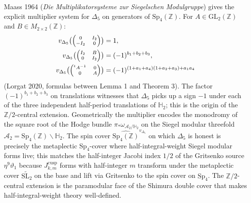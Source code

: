 \begin{remark}
\label{rem:k3e-maass-multiplier-explicit}
Maass 1964 (\emph{Die Multiplikatorsysteme zur Siegelschen Modulgruppe}) gives the
explicit multiplier system for $\Delta_5$ on generators of $\mathrm{Sp}_4(\mathbb{Z})$.
For $A\in\mathrm{GL}_2(\mathbb{Z})$ and $B\in M_{2\times 2}(\mathbb{Z})$:
\begin{align*}
 v_{\Delta_5}\bigl({\scriptsize\begin{pmatrix} 0 & I_2 \\ -I_2 & 0\end{pmatrix}}\bigr)
 &= 1, \\
 v_{\Delta_5}\bigl({\scriptsize\begin{pmatrix} I_2 & B \\ 0 & I_2\end{pmatrix}}\bigr)
 &= (-1)^{b_1+b_2+b_3}, \\
 v_{\Delta_5}\bigl({\scriptsize\begin{pmatrix} {}^tA^{-1} & 0 \\ 0 & A\end{pmatrix}}\bigr)
 &= (-1)^{(1+a_1+a_4)(1+a_2+a_3)+a_1 a_4}
\end{align*}
(Lorgat 2020, formulas between Lemma 1 and Theorem 3). The factor $(-1)^{b_1+b_2+b_3}$
on translations witnesses that $\Delta_5$ picks up a sign $-1$ under each of the three
independent half-period translations of $\mathbb{H}_2$; this is the origin of the
$\mathbb{Z}/2$-central extension. Geometrically the multiplier encodes the monodromy
of the square root of the Hodge bundle $\pi_*\omega_{\mathcal{A}_2/\mathbb{H}_2}$ on
the Siegel modular threefold $\mathcal{A}_2 = \mathrm{Sp}_4(\mathbb{Z})\backslash\mathbb{H}_2$.
The spin cover $\widehat{\mathrm{Sp}_4(\mathbb{Z})}^{v_{\Delta_5}}$ on which
$\Delta_5$ is honest is precisely the metaplectic $\mathrm{Sp}_4$-cover where
half-integral-weight Siegel modular forms live; this matches the half-integer Jacobi
index $1/2$ of the Gritsenko source $\eta^9\vartheta_1$ because
$J^{\mathrm{cusp}}_{k,m}$ forms with half-integer $m$ transform under the metaplectic
cover $\widetilde{\mathrm{SL}_2}$ on the base and lift via Gritsenko to the spin cover
on $\mathrm{Sp}_4$. The $\mathbb{Z}/2$-central extension is the paramodular face of the
Shimura double cover that makes half-integral-weight theory well-defined.
\end{remark}

